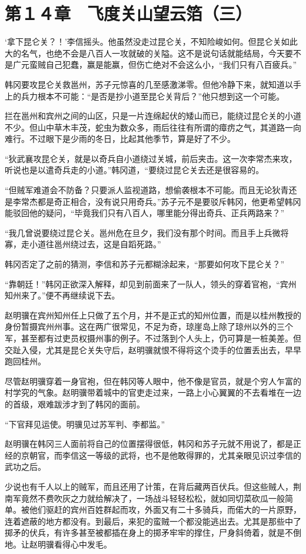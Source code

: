\section{第１４章　飞度关山望云箔（三）}

‘拿下昆仑关？！’李信摇头。他虽然没走过昆仑关，不知险峻如何。但昆仑关如此大的名气，也绝不会是八百人一攻就破的关隘。这不是说句话就能结局，今天要不是广元蛮贼自己犯蠢，赢是能赢，但伤亡绝对不会这么小，“我们只有八百疲兵。”

韩冈要攻昆仑关救邕州，苏子元惊喜的几至感激涕零。但他冷静下来，就知道以手上的兵力根本不可能：“是否是抄小道至昆仑关背后？”他只想到这一个可能。

拦在邕州和宾州之间的山区，只是一片连绵起伏的矮山而已，能绕过昆仑关的小道不少。但山中草木丰茂，蛇虫为数众多，雨后往往有所谓的瘴疠之气，其道路一向难行。不过眼下是少雨的冬日，比起其他季节，算是好了不少。

“狄武襄攻昆仑关，就是以奇兵自小道绕过关城，前后夹击。这一次李常杰来攻，听说也是以遣奇兵走的小道。”韩冈道，“要绕过昆仑关去还是很容易的。

“但贼军难道会不防备？只要派人监视道路，想偷袭根本不可能。而且无论狄青还是李常杰都是奇正相合，没有说只用奇兵。”苏子元不是要驳斥韩冈，他更希望韩冈能驳回他的疑问，“毕竟我们只有八百人，哪里能分得出奇兵、正兵两路来？”

“我几曾说要绕过昆仑关。邕州危在旦夕，我们没有那个时间。而且手上兵微将寡，走小道往邕州绕过去，这是自蹈死路。”

韩冈否定了之前的猜测，李信和苏子元都糊涂起来，“那要如何攻下昆仑关？”

“靠朝廷！”韩冈正欲深入解释，却见到前面来了一队人，领头的穿着官袍，“宾州知州来了。”便不再继续说下去。

赵明骥在宾州知州任上只做了五个月，并不是正式的知州位置，而是以桂州教授的身份暂摄宾州州事。这在两广很常见，不足为奇，琼崖岛上除了琼州以外的三个军，甚至都有过吏员权摄州事的例子。不过落到个人头上，仍可算是一桩美差。但交趾入侵，尤其是昆仑关失守后，赵明骥就恨不得将这个烫手的位置丢出去，早早跑回桂州。

尽管赵明骥穿着一身官袍，但在韩冈等人眼中，他不像是官员，就是个穷人乍富的村学究的气象。赵明骥带着城中的官吏走过来，一路上小心翼翼的不去看堆在一边的首级，艰难跋涉才到了韩冈的面前。

“下官拜见运使。明骥见过苏军判、李都监。”

赵明骥在韩冈三人面前将自己的位置摆得很低，韩冈和苏子元就不用说了，都是正经的京朝官，而李信这一等级的武将，也不是他敢得罪的，尤其亲眼见识过李信的武功之后。

少说也有千人以上的贼军，而且还用了计策，在背后藏两百伏兵。但这些贼人，荆南军竟然不费吹灰之力就给解决了，一场战斗轻轻松松，就如同切菜砍瓜一般简单。被他们驱赶的宾州百姓群起而攻，外面又有二十多骑兵，而偌大的一片原野，连着遮蔽的地方都没有。到最后，来犯的蛮贼一个都没能逃出去。尤其是那些中了掷矛的伏兵，有许多甚至被都插在身上的掷矛牢牢的撑住，尸身斜倚着，就是不倒地。让赵明骥看得心中发毛。

